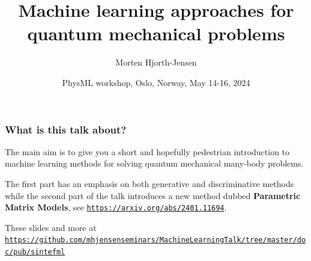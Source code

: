 \documentclass{beamer}
\begin{document}

\newcommand{\exercisesection}[1]{\subsection*{#1}}







\title{Machine learning approaches for quantum mechanical problems}


\author{Morten Hjorth-Jensen}

\date{PhysML workshop, Oslo, Norway, May 14-16, 2024
}

\begin{frame}
\titlepage
\end{frame}

\begin{frame}
\frametitle{What is this talk about?}

\begin{block}{}

The main aim is to give you a short and hopefully pedestrian
introduction to machine learning methods for solving quantum
mechanical many-body problems.

The first part has an emphasis on both generative and discriminative
methods while the second part of the talk introduces a new method
dubbed \textbf{Parametric Matrix Models}, see
\href{{https://arxiv.org/abs/2401.11694}}{\nolinkurl{https://arxiv.org/abs/2401.11694}}.
\end{block}

\begin{block}{}
These slides and more at \href{{https://github.com/mhjensenseminars/MachineLearningTalk/tree/master/doc/pub/sintefml}}{\nolinkurl{https://github.com/mhjensenseminars/MachineLearningTalk/tree/master/doc/pub/sintefml}}
\end{block}
\end{frame}
\end{document}
